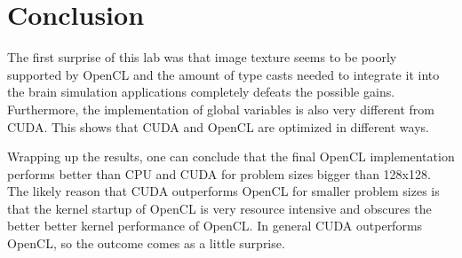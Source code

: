\documentclass[final]{report}
\begin{document}
\chapter{Conclusion}
The first surprise of this lab was that image texture seems to be poorly supported by OpenCL and the amount of type casts needed to integrate it into the brain simulation applications completely defeats the possible gains.
Furthermore, the implementation of global variables is also very different from CUDA.
This shows that CUDA and OpenCL are optimized in different ways.

Wrapping up the results, one can conclude that the final OpenCL implementation performs better than CPU and CUDA for problem sizes bigger than 128x128.
The likely reason that CUDA outperforms OpenCL for smaller problem sizes is that the kernel startup of OpenCL is very resource intensive and obscures the better better kernel performance of OpenCL.
In general CUDA outperforms OpenCL, so the outcome comes as a little surprise.







\end{document}

